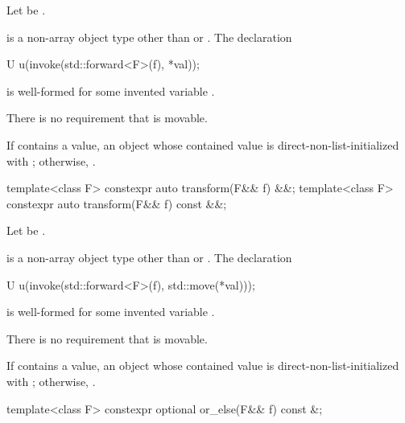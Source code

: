 \begin{itemdescr}
\pnum
Let  be .

\pnum
\mandates
{} is a  non-array object type
other than  or .
The declaration
\begin{codeblock}
U u(invoke(std::forward<F>(f), *val));
\end{codeblock}
is well-formed for some invented variable .
\begin{note}
There is no requirement that  is movable.
\end{note}

\pnum
\returns
If  contains a value, an  object
whose contained value is direct-non-list-initialized with
;
otherwise, .
\end{itemdescr}

\begin{itemdecl}
template<class F> constexpr auto transform(F&& f) &&;
template<class F> constexpr auto transform(F&& f) const &&;
\end{itemdecl}

\begin{itemdescr}
\pnum
Let  be
.

\pnum
\mandates
{} is a  non-array object type
other than  or .
The declaration
\begin{codeblock}
U u(invoke(std::forward<F>(f), std::move(*val)));
\end{codeblock}
is well-formed for some invented variable .
\begin{note}
There is no requirement that  is movable.
\end{note}

\pnum
\returns
If  contains a value, an  object
whose contained value is direct-non-list-initialized with
;
otherwise, .
\end{itemdescr}

\begin{itemdecl}
template<class F> constexpr optional or_else(F&& f) const &;
\end{itemdecl}

